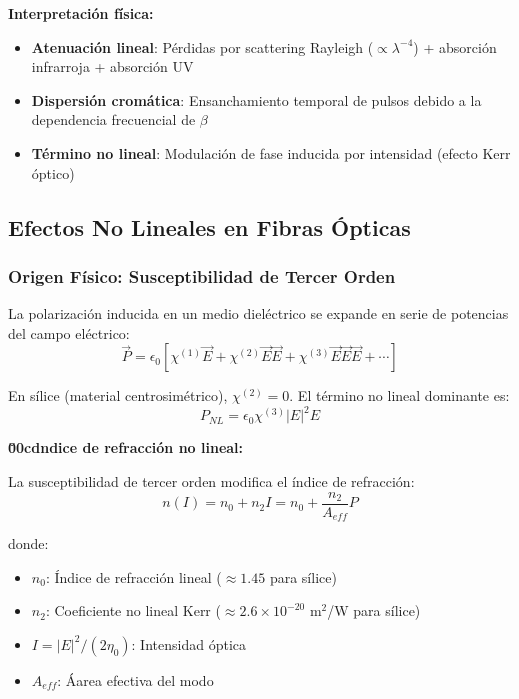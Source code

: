 \documentclass[11pt,a4paper]{article}
\begin{document}
\textbf{Interpretación física:}
\begin{itemize}
    \item \textbf{Atenuación lineal}: Pérdidas por scattering Rayleigh ($\propto \lambda^{-4}$) + absorción infrarroja + absorción UV
    \item \textbf{Dispersión cromática}: Ensanchamiento temporal de pulsos debido a la dependencia frecuencial de $\beta$
    \item \textbf{Término no lineal}: Modulación de fase inducida por intensidad (efecto Kerr óptico)
\end{itemize}

\subsection{Efectos No Lineales en Fibras Ópticas}

\subsubsection{Origen Físico: Susceptibilidad de Tercer Orden}

La polarización inducida en un medio dieléctrico se expande en serie de potencias del campo eléctrico:
\begin{equation}
    \vec{P} = \epsilon_0[\chi^{(1)}\vec{E} + \chi^{(2)}\vec{E}\vec{E} + \chi^{(3)}\vec{E}\vec{E}\vec{E} + \cdots]
\end{equation}

En sílice (material centrosimétrico), $\chi^{(2)} = 0$. El término no lineal dominante es:
\begin{equation}
    P_{NL} = \epsilon_0 \chi^{(3)}|E|^2E
\end{equation}

\textbf{\u00cdndice de refracción no lineal:}

La susceptibilidad de tercer orden modifica el índice de refracción:
\begin{equation}
    n(I) = n_0 + n_2 I = n_0 + \frac{n_2}{A_{eff}}P
\end{equation}

donde:
\begin{itemize}
    \item $n_0$: Índice de refracción lineal ($\approx 1.45$ para sílice)
    \item $n_2$: Coeficiente no lineal Kerr ($\approx 2.6 \times 10^{-20}$ m$^2$/W para sílice)
    \item $I = |E|^2/(2\eta_0)$: Intensidad óptica
    \item $A_{eff}$: Áarea efectiva del modo
\end{itemize}
\end{document}
